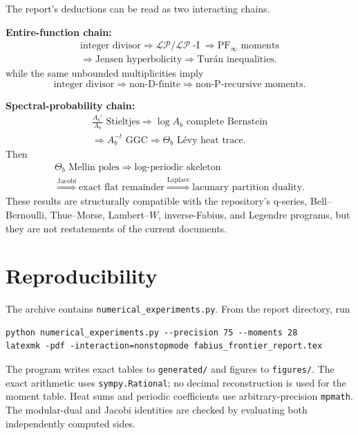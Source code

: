 \documentclass[11pt]{article}
\theoremstyle{definition}
\theoremstyle{remark}
\newcommand{\PF}{\mathrm{PF}_{\infty}}
\newcommand{\LP}{\mathcal{LP}}
\newcommand{\LPI}{\mathcal{LP}\!\operatorname{-I}}
\begin{document}
The report's deductions can be read as two interacting chains.

\medskip
\noindent\textbf{Entire-function chain:}
\[
\begin{gathered}
\text{integer divisor}
\Longrightarrow \LP/\LPI
\Longrightarrow \PF\text{ moments}\\
\Longrightarrow \text{Jensen hyperbolicity}
\Longrightarrow \text{Tur\'an inequalities}.
\end{gathered}
\]
while the same unbounded multiplicities imply
\[
\text{integer divisor}
\Longrightarrow \text{non-D-finite}
\Longrightarrow \text{non-P-recursive moments}.
\]

\medskip
\noindent\textbf{Spectral-probability chain:}
\[
\begin{gathered}
\frac{A_b'}{A_b}\text{ Stieltjes}
\Longrightarrow \log A_b\text{ complete Bernstein}\\
\Longrightarrow A_b^{-t}\text{ GGC}
\Longrightarrow \Theta_b\text{ L\'evy heat trace}.
\end{gathered}
\]
Then
\[
\begin{gathered}
\Theta_b\text{ Mellin poles}
\Longrightarrow \text{log-periodic skeleton}\\
\overset{\text{Jacobi}}{\Longrightarrow}
\text{exact flat remainder}
\overset{\text{Laplace}}{\Longrightarrow}
\text{lacunary partition duality}.
\end{gathered}
\]
These results are structurally compatible with the repository's q-series, Bell--Bernoulli, Thue--Morse, Lambert--\(W\), inverse-Fabius, and Legendre programs, but they are not restatements of the current documents.

\appendix
\section{Reproducibility}

The archive contains \texttt{numerical\_experiments.py}.  From the report directory, run
\begin{lstlisting}[style=pythonstyle]
python numerical_experiments.py --precision 75 --moments 28
latexmk -pdf -interaction=nonstopmode fabius_frontier_report.tex
\end{lstlisting}
The program writes exact tables to \texttt{generated/} and figures to
\texttt{figures/}.  The exact arithmetic uses \texttt{sympy.Rational}; no decimal reconstruction is used for the moment table.  Heat sums and periodic coefficients use arbitrary-precision \texttt{mpmath}.  The modular-dual and Jacobi identities are checked by evaluating both independently computed sides.
\end{document}
